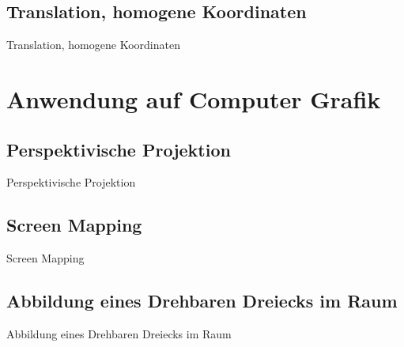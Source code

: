 \documentclass[10pt,aspectratio=169]{beamer}
\begin{document}
  \subsection{Translation, homogene Koordinaten}
  \begin{frame}{Translation, homogene Koordinaten}
  \end{frame}

  \section{Anwendung auf Computer Grafik}


  \subsection{Perspektivische Projektion}
  \begin{frame}{Perspektivische Projektion}
  \end{frame}


  \subsection{Screen Mapping}
  \begin{frame}{Screen Mapping}
  \end{frame}

  \subsection{Abbildung eines Drehbaren Dreiecks im Raum}
  \begin{frame}{Abbildung eines Drehbaren Dreiecks im Raum}
  \end{frame}
\end{document}
